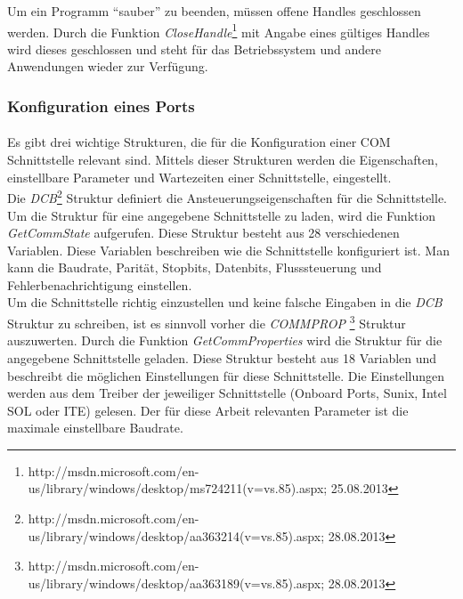 Um ein Programm "`sauber"' zu beenden, müssen offene Handles geschlossen werden. Durch die Funktion \textit{CloseHandle}\footnote{http://msdn.microsoft.com/en-us/library/windows/desktop/ms724211(v=vs.85).aspx; 25.08.2013} mit Angabe eines gültiges Handles wird dieses geschlossen und steht für das Betriebssystem und andere Anwendungen wieder zur Verfügung.


\subsubsection{Konfiguration eines Ports}
\paragraph{}
Es gibt drei wichtige Strukturen, die für die Konfiguration einer COM Schnittstelle relevant sind. Mittels dieser Strukturen werden die Eigenschaften, einstellbare Parameter und Wartezeiten einer Schnittstelle, eingestellt.
\\

Die \textit{DCB}\footnote{http://msdn.microsoft.com/en-us/library/windows/desktop/aa363214(v=vs.85).aspx; 28.08.2013} Struktur definiert die Ansteuerungseigenschaften für die Schnittstelle. Um die Struktur für eine angegebene Schnittstelle zu laden, wird die Funktion \textit{GetCommState} aufgerufen. Diese Struktur besteht aus 28 verschiedenen Variablen. Diese Variablen beschreiben wie die Schnittstelle konfiguriert ist. Man kann die Baudrate, Parität, Stopbits, Datenbits, Flusssteuerung und Fehlerbenachrichtigung einstellen.
\\

Um die Schnittstelle richtig einzustellen und keine falsche Eingaben in die \textit{DCB} Struktur zu schreiben, ist es sinnvoll vorher die \textit{COMMPROP} \footnote{http://msdn.microsoft.com/en-us/library/windows/desktop/aa363189(v=vs.85).aspx; 28.08.2013} Struktur auszuwerten. Durch die Funktion \textit{GetCommProperties} wird die Struktur für die angegebene Schnittstelle geladen. Diese Struktur besteht aus 18 Variablen und beschreibt die möglichen Einstellungen für diese Schnittstelle. Die Einstellungen werden aus dem Treiber der jeweiliger Schnittstelle (Onboard Ports, Sunix, Intel SOL oder ITE) gelesen. Der für diese Arbeit relevanten Parameter ist die maximale einstellbare Baudrate.
\\

